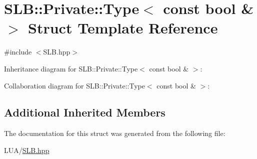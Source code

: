 \hypertarget{structSLB_1_1Private_1_1Type_3_01const_01bool_01_6_01_4}{}\section{S\+LB\+:\+:Private\+:\+:Type$<$ const bool \& $>$ Struct Template Reference}
\label{structSLB_1_1Private_1_1Type_3_01const_01bool_01_6_01_4}


{\ttfamily \#include $<$S\+L\+B.\+hpp$>$}



Inheritance diagram for S\+LB\+:\+:Private\+:\+:Type$<$ const bool \& $>$\+:


Collaboration diagram for S\+LB\+:\+:Private\+:\+:Type$<$ const bool \& $>$\+:
\subsection*{Additional Inherited Members}


The documentation for this struct was generated from the following file\+:\begin{DoxyCompactItemize}
\item 
L\+U\+A/\hyperlink{SLB_8hpp}{S\+L\+B.\+hpp}\end{DoxyCompactItemize}
